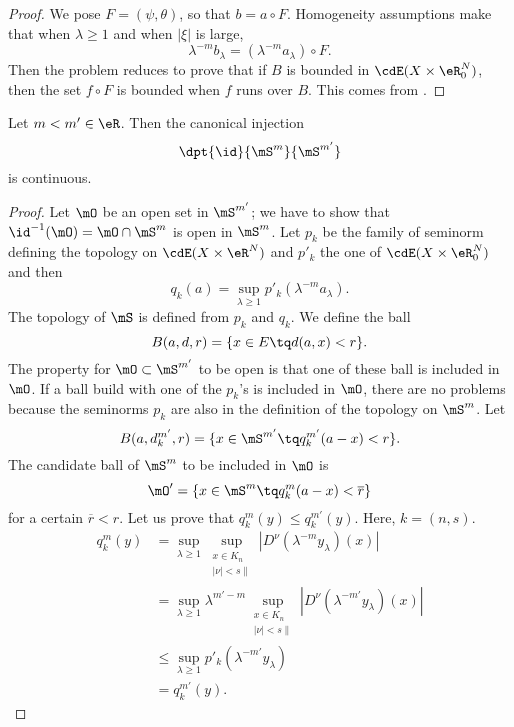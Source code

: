 \begin{proof}
We pose $F=(\psi,\theta)$, so that $b=a\circ F$. Homogeneity assumptions make that when $\lambda\geq 1$ and when $|\xi|$ is large, 
\[
   \lambda^{-m}b_{\lambda}=(\lambda^{-m}a_{\lambda})\circ F.
\]
Then the problem reduces to prove that if $B$ is bounded in $\cdE(X\times\eR^N_0)$, then the set $f\circ F$ is bounded when $f$ runs over $B$. This comes from .
\end{proof}


\begin{lemma}
Let $m<m'\in\eR$. Then the canonical injection
\[ 
\dpt{\id}{\mS^m}{\mS^{m'}}
\]
is continuous.

\end{lemma}


\begin{proof}
Let $\mO$ be an open set in $\mS^{m'}$; we have to show that $\id^{-1}(\mO)=\mO\cap\mS^{m}$ is open in $\mS^m$. Let $p_k$ be the family of seminorm defining the topology on $\cdE(X\times\eR^N)$ and $p'_k$ the one of $\cdE(X\times\eR^N_0)$ and then
\[ 
q_k(a)=\sup_{\lambda\geq 1}p'_k(\lambda^{-m}a_{\lambda}).
\]
The topology of $\mS$ is defined from $p_k$ and $q_k$. We define the ball
\[ 
B(a,d,r)=\{x\in E\tq d(a,x)<r\}.
\]
The property for $\mO\subset\mS^{m'}$ to be open is that one of these ball is included in $\mO$. If a ball build with one of the $p_k$'s is included in $\mO$, there are no problems because the seminorms $p_k$ are also in the definition of the topology on $\mS^m$. Let
\[ 
  B(a,d_k^{m'},r)=\{x\in\mS^{m'}\tq q_k^{m'}(a-x)<r\}.
\]
The candidate ball of $\mS^m$ to be included in $\mO$ is
\[ 
\mO'=\{x\in\mS^m\tq q_k^m(a-x)<\overline{r}\}
\]
for a certain $\overline{r}<r$. Let us prove that $q_k^m(y)\leq q_k^{m'}(y)$. Here, $k=(n,s)$.
\begin{equation}
\begin{split}
q_k^m(y)&=\sup_{\lambda\geq 1}\sup_{\substack{x\in K_n\\|\nu|<s\|}}| D^{\nu}(\lambda^{-m}y_{\lambda})(x) |\\
        &=\sup_{\lambda\geq 1}\lambda^{m'-m}\sup_{\substack{x\in K_n\\|\nu|<s\|}}| D^{\nu}(\lambda^{-m'}y_{\lambda})(x) |\\
        &\leq\sup_{\lambda\geq 1}p'_k(\lambda^{-m'}y_{\lambda})\\
        &=q_k^{m'}(y).
\end{split}
\end{equation}

\end{proof}

